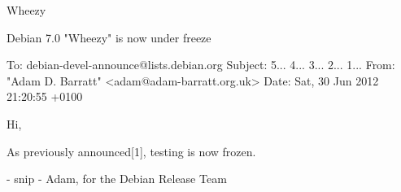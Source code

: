 {


{


\begin{frame}[plain]%

\begin{center}
\pause
{\fontsize{40pt}{40pt}\selectfont\color{red}Wheezy}

\end{center}

\end{frame}
}

\begin{frame}[containsverbatim]{Debian 7.0 "Wheezy" is now under freeze}

\begin{commandline}

To: debian-devel-announce@lists.debian.org
Subject: 5... 4... 3... 2... 1...
From: "Adam D. Barratt" <adam@adam-barratt.org.uk>
Date: Sat, 30 Jun 2012 21:20:55 +0100

Hi, 

As previously announced[1], testing is now frozen.

- snip -
Adam,
for the Debian Release Team

\end{commandline}

\end{frame}


}
